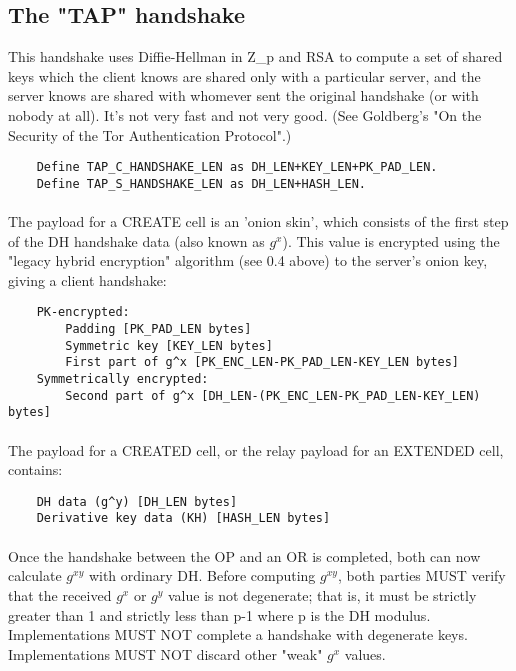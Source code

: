 \subsection{The "TAP" handshake}
This handshake uses Diffie-Hellman in Z\_p and RSA to compute a set of
shared keys which the client knows are shared only with a particular
server, and the server knows are shared with whomever sent the
original handshake (or with nobody at all). It's not very fast and
not very good. (See Goldberg's "On the Security of the Tor
Authentication Protocol".)

\begin{verbatim}
    Define TAP_C_HANDSHAKE_LEN as DH_LEN+KEY_LEN+PK_PAD_LEN.
    Define TAP_S_HANDSHAKE_LEN as DH_LEN+HASH_LEN.
\end{verbatim}

\paragraph{}
The payload for a CREATE cell is an 'onion skin', which consists of
the first step of the DH handshake data (also known as $g^x$). This
value is encrypted using the "legacy hybrid encryption" algorithm
(see 0.4 above) to the server's onion key, giving a client handshake:

\begin{verbatim}
    PK-encrypted:
        Padding [PK_PAD_LEN bytes]
        Symmetric key [KEY_LEN bytes]
        First part of g^x [PK_ENC_LEN-PK_PAD_LEN-KEY_LEN bytes]
    Symmetrically encrypted:
        Second part of g^x [DH_LEN-(PK_ENC_LEN-PK_PAD_LEN-KEY_LEN) bytes]
\end{verbatim}

\paragraph{}
The payload for a CREATED cell, or the relay payload for an
EXTENDED cell, contains:

\begin{verbatim}
    DH data (g^y) [DH_LEN bytes]
    Derivative key data (KH) [HASH_LEN bytes]
\end{verbatim}

\paragraph{}
Once the handshake between the OP and an OR is completed, both can
now calculate $g^{xy}$ with ordinary DH. Before computing $g^{xy}$, both parties
MUST verify that the received $g^x$ or $g^y$ value is not degenerate;
that is, it must be strictly greater than 1 and strictly less than p-1
where p is the DH modulus. Implementations MUST NOT complete a handshake
with degenerate keys. Implementations MUST NOT discard other "weak"
$g^x$ values.

